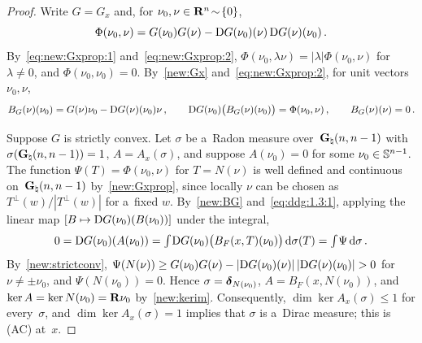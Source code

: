 \documentclass[a4paper,twoside,leqno]{article}
\newcommand{\Gh}{\pgrass{\adim}{\adim-1}}      %
\begin{document}
\begin{proof}
    Write $G = G_x$ and, for $\nu_0, \nu \in \mathbf{R}^{n} \!\sim\! \{0\}$,
    \begin{displaymath}
        \Phi(\nu_0,\nu) = G(\nu_0) G(\nu) - \mathrm{D} G(\nu_0)(\nu) \, \mathrm{D} G(\nu)(\nu_0) \,.
    \end{displaymath}
    By~\eqref{eq:new:Gxprop:1} and~\eqref{eq:new:Gxprop:2}, $\Phi(\nu_0, \lambda \nu) = |\lambda|
    \Phi(\nu_0,\nu)$ for $\lambda \ne 0$, and $\Phi(\nu_0,\nu_0) = 0$. By~\ref{new:Gx}
    and~\eqref{eq:new:Gxprop:2}, for unit vectors $\nu_0, \nu$,
    \begin{equation}
        \label{eq:ddg:1.3:1}
        B_G(\nu)(\nu_0) = G(\nu) \nu_0 - \mathrm{D} G(\nu)(\nu_0) \nu \,, \qquad \mathrm{D} G(\nu_0)
        \bigl( B_G(\nu)(\nu_0) \bigr) = \Phi(\nu_0,\nu) \,, \qquad B_G(\nu)(\nu) = 0 \,.
    \end{equation}

    Suppose $G$ is strictly convex. Let $\sigma$ be a~Radon measure over~$\Gh$ with $\sigma(\Gh)
    = 1$, $A = A_x(\sigma)$, and suppose $A(\nu_0) = 0$ for some $\nu_0 \in \mathbb{S}^{n-1}$. The
    function $\Psi(T) = \Phi(\nu_0,\nu)$ for $T = N(\nu)$ is well defined and continuous on~$\Gh$
    by~\ref{new:Gxprop}, since locally $\nu$ can be chosen as $T^\perp(w)/|T^\perp(w)|$ for a~fixed
    $w$. By~\ref{new:BG} and~\eqref{eq:ddg:1.3:1}, applying the linear map $[ B \mapsto \mathrm{D}
    G(\nu_0)(B(\nu_0)) ]$ under the integral,
    \begin{displaymath}
        0 = \mathrm{D} G(\nu_0)(A(\nu_0)) = {\textstyle\int_{}^{}} \mathrm{D} G(\nu_0)\bigl( B_F(x,T)(\nu_0) \bigr) \,\mathrm{d}
        \sigma(T) = {\textstyle\int_{}^{}} \Psi \,\mathrm{d} \sigma \,.
    \end{displaymath}
    By~\ref{new:strictconv}, $\Psi(N(\nu)) \ge G(\nu_0) G(\nu) - |\mathrm{D} G(\nu_0)(\nu)| \, |\mathrm{D}
    G(\nu)(\nu_0)| > 0$ for $\nu \ne \pm \nu_0$, and $\Psi(N(\nu_0)) = 0$. Hence $\sigma =
    \boldsymbol{\delta}_{N(\nu_0)}$, $A = B_F(x,N(\nu_0))$, and $\ker A = \ker N(\nu_0) = \mathbf{R} \nu_0$
    by~\ref{new:kerim}. Consequently, $\dim \ker A_x(\sigma) \le 1$ for every~$\sigma$, and $\dim
    \ker A_x(\sigma) = 1$ implies that $\sigma$ is a~Dirac measure; this is (AC) at~$x$.


\end{proof}
\end{document}
